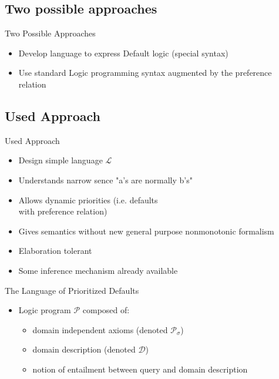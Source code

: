 \documentclass{beamer}
\begin{document}
  \subsection[Approaches]{Two possible approaches}

  \begin{frame}{Two Possible Approaches}
    \begin{itemize}
      \item Develop language to express Default logic (special syntax)
      \item Use standard Logic programming syntax augmented by
            the preference relation
    \end{itemize}
  \end{frame}

  \subsection[Used Approach]{Used Approach}

  \begin{frame}{Used Approach}
    \begin{itemize}
      \item Design simple language $\mathcal{L}$
      \item Understands narrow sence "a's are normally b's"
      \item Allows dynamic priorities (i.e. defaults \\ with preference relation)
      \item Gives semantics without new general purpose nonmonotonic formalism
      \item Elaboration tolerant
      \item Some inference mechanism already available
    \end{itemize}
  \end{frame}

  \begin{frame}{The Language of Prioritized Defaults}
    \begin{itemize}
      \item Logic program $\mathcal{P}$ composed of:
        \begin{itemize}
          \item domain independent axioms (denoted $\mathcal{P}_\sigma$)
          \item domain description (denoted $\mathcal{D}$)
          \item notion of entailment between query and domain description
        \end{itemize}
    \end{itemize}
  \end{frame}
\end{document}
